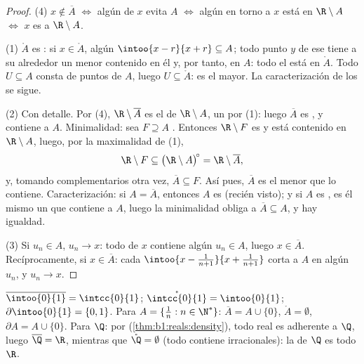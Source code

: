 \begin{proof}
(4) $x \notin \overline A$ $\iff$ algún  de $x$ evita $A$
$\iff$ algún  en torno a $x$ está en $\R \setminus A$ $\iff$
$x$ es  a $\R \setminus A$.

(1) $\mathring A$ es : si $x \in \mathring A$, algún
$\intoo{x-r}{x+r} \subseteq A$; todo punto $y$ de ese  tiene
a su alrededor un  menor contenido en él y, por tanto, en
$A$: todo el  está en $\mathring A$. Todo 
$U \subseteq A$ consta de puntos  de $A$, luego
$U \subseteq \mathring A$: es el mayor. La caracterización de los
 se sigue.

(2) Con detalle. Por (4), $\R \setminus \overline A$ es el 
de $\R \setminus A$, un  por (1): luego $\overline A$ es
, y contiene a $A$. Minimalidad: sea $F \supseteq A$
. Entonces $\R \setminus F$ es  y está contenido en
$\R \setminus A$, luego, por la maximalidad de (1),
\[
\R \setminus F \subseteq \bigl(\R \setminus A\bigr)^{\!\circ}
= \R \setminus \overline A ,
\]
y, tomando complementarios otra vez, $\overline A \subseteq F$. Así
pues, $\overline A$ es el menor  que lo contiene.
Caracterización: si $A = \overline A$, entonces $A$ es 
(recién visto); y si $A$ es , es él mismo un  que
contiene a $A$, luego la minimalidad obliga a
$\overline A \subseteq A$, y hay igualdad.

(3) Si $u_n \in A$, $u_n \to x$: todo  de $x$ contiene algún
$u_n \in A$, luego $x \in \overline A$. Recíprocamente, si
$x \in \overline A$: cada  $\intoo{x - \frac{1}{n+1}}{x +
\frac{1}{n+1}}$ corta a $A$ en algún $u_n$, y $u_n \to x$.
\end{proof}

\begin{example}\label{ex:b1:topology:closureexamples}
$\overline{\intoo{0}{1}} = \intcc{0}{1}$;
$\mathring{\intcc{0}{1}} = \intoo{0}{1}$;
$\partial\intoo{0}{1} = \{0, 1\}$. Para $A = \{\frac 1n : n \in \N^*\}$:
$\overline A = A \cup \{0\}$, $\mathring A = \emptyset$,
$\partial A = A \cup \{0\}$. Para $\Q$: por 
(\cref{thm:b1:reals:density}), todo real es adherente a $\Q$, luego
$\overline{\Q} = \R$, mientras que $\mathring{\Q} = \emptyset$ (todo
 contiene irracionales): la  de $\Q$ es todo $\R$.
\end{example}

